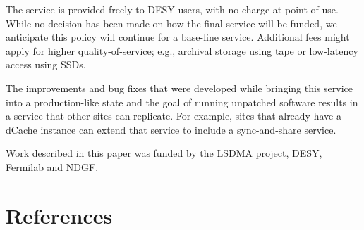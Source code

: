 \documentclass[a4paper]{jpconf}
\begin{document}
The service is provided freely to DESY users, with no charge at point
of use.  While no decision has been made on how the final service will
be funded, we anticipate this policy will continue for a base-line
service.  Additional fees might apply for higher quality-of-service;
e.g., archival storage using tape or low-latency access using SSDs.

The improvements and bug fixes that were developed while bringing this
service into a production-like state and the goal of running unpatched
software results in a service that other sites can replicate.  For
example, sites that already have a dCache instance can extend that
service to include a sync-and-share service.

\ack

Work described in this paper was funded by the LSDMA project, DESY,
Fermilab and NDGF.

\section*{References}

\end{document}
